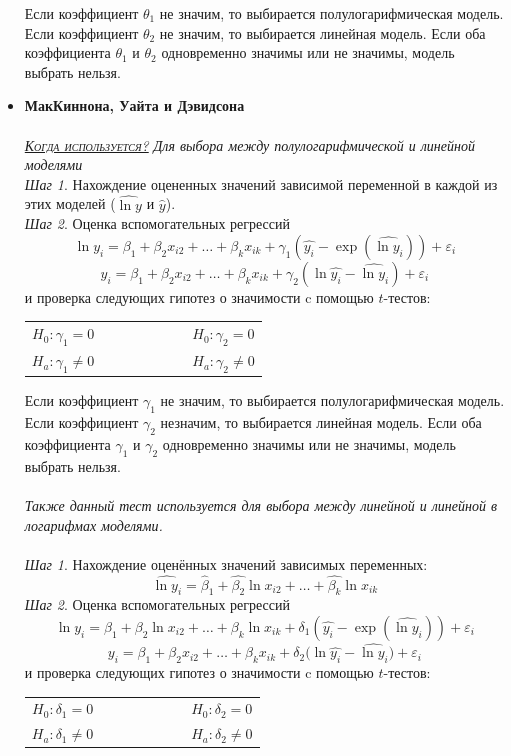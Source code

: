 \documentclass[a0,final]{a0poster}
\begin{document}
\begin{multicols}{4}
\begin{itemize}
Если коэффициент $\theta_1$ не значим, то выбирается полулогарифмическая модель. Если коэффициент $\theta_2$ не значим, то выбирается линейная модель. Если оба коэффициента $\theta_1$ и $\theta_2$ одновременно значимы или не значимы, модель выбрать нельзя.  \\
\item \textbf{МакКиннона, Уайта и Дэвидсона}\\
\\
\underline{\textsc{\textit{Когда используется?}}} \textit{Для выбора между полулогарифмической и линейной моделями}\\
\textit{Шаг 1}. Нахождение оцененных значений зависимой переменной в каждой из этих моделей ($\hat{\ln{y}}$ и $\hat{y}$).\\
\textit{Шаг 2}. Оценка вспомогательных регрессий
\[\ln{y_i} = {\beta}_1 + \beta_2x_{i2}+ \ldots +\beta_kx_{ik} + {\gamma}_1(\hat{y_i}-\exp{(\hat{\ln{y_i}})}) + \varepsilon_{i}\]
\[y_i ={\beta}_1 + \beta_2x_{i2}+ \ldots +\beta_kx_{ik} + {\gamma}_2(\ln{\hat{y_i}-\hat{\ln{y_i}}}) + \varepsilon_{i}\]
и проверка следующих гипотез о значимости c помощью $t$-тестов:
\begin{center}
\begin{tabular}{r  l}
$H_0: \gamma_1 = 0 \qquad \qquad \qquad$ &$H_0: \gamma_2 = 0$ \\
$H_a: \gamma_1 \ne 0 \qquad \qquad \qquad$&$H_a: \gamma_2 \ne 0$
\end{tabular}
\end{center}

Если коэффициент $\gamma_1$ не значим, то выбирается полулогарифмическая модель. Если коэффициент $\gamma_2$ незначим, то выбирается линейная модель. Если оба коэффициента $\gamma_1$ и $\gamma_2$ одновременно значимы или не значимы, модель выбрать нельзя.  \\
\\
\textit{Также данный тест используется для выбора между линейной и линейной в логарифмах моделями.}\\
\\
\textit{Шаг 1}. Нахождение оценённых значений зависимых переменных:\[\hat{\ln{y_i}} = \hat{\beta}_1 + \hat{\beta_2}\ln{x_{i2}}+ \ldots +\hat{\beta_k}\ln{x_{ik}}\]
\textit{Шаг 2}. Оценка вспомогательных регрессий
\[\ln{y_i} = {\beta}_1 + \beta_2\ln{x_{i2}}+ \ldots +\beta_k\ln{x_{ik}} + {\delta}_1(\hat{y_i}-\exp{(\hat{\ln{y_i}})}) + \varepsilon_i\]
\[y_i ={\beta}_1 + \beta_2x_{i2}+ \ldots +\beta_kx_{ik} + {\delta}_2(\ln{\hat{y_i}-\hat{\ln{y_i}})} + \varepsilon_i\]
и проверка следующих гипотез о значимости c помощью $t$-тестов:
\begin{center}
\begin{tabular}{r  l}
$H_0: \delta_1 = 0 \qquad \qquad \qquad$ &$H_0: \delta_2 = 0$ \\
$H_a: \delta_1 \ne 0 \qquad \qquad \qquad$&$H_a: \delta_2 \ne 0$
\end{tabular}
\end{center}


\end{itemize}
\end{multicols}
\end{document}
